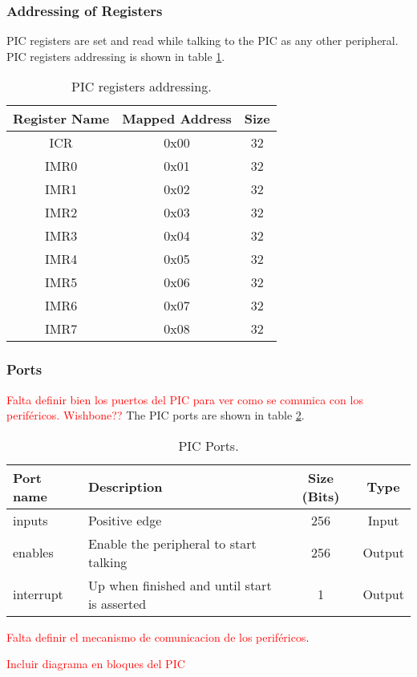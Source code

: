 \subsubsection{Addressing of Registers}
\label{sssec:pic_reg_addresses}
PIC registers are set and read while talking to the PIC as any other peripheral. PIC registers addressing is shown in table
\ref{tbl:pic_reg_addresses}.

\begin{table}
  \begin{center}
    \begin{tabular}{|c|c|c|}
    \hline
    \textbf{Register Name} & \textbf{Mapped Address} & \textbf{Size}\\
    \hline
    ICR  & 0x00 & 32\\
    IMR0 & 0x01 & 32\\
    IMR1 & 0x02 & 32\\
    IMR2 & 0x03 & 32\\
    IMR3 & 0x04 & 32\\
    IMR4 & 0x05 & 32\\
    IMR5 & 0x06 & 32\\
    IMR6 & 0x07 & 32\\
    IMR7 & 0x08 & 32\\
    \hline
    \end{tabular}
  \caption{PIC registers addressing.}
  \label{tbl:pic_reg_addresses}
  \end{center}
\end{table}

\subsubsection{Ports}
\label{ssec:pic_ports}
\textcolor{red}{Falta definir bien los puertos del PIC para ver como se comunica con los periféricos. Wishbone??}
The PIC ports are shown in table \ref{tbl:pic_ports}.

\begin{table}
  \begin{center}
    \begin{tabular}{|l|l|c|c|}
    \hline
    \textbf{Port name} & \textbf{Description} & \textbf{Size (Bits)} & \textbf{Type}\\
    \hline
    inputs             & Positive edge & 256 & Input \\
    enables            & Enable the peripheral to start talking & 256 & Output \\
    interrupt          & Up when finished and until start is asserted & 1 & Output \\
    \hline
    \end{tabular}
  \end{center}
  \caption{PIC Ports.}
  \label{tbl:pic_ports}
\end{table}

\textcolor{red}{Falta definir el mecanismo de comunicacion de los periféricos}.

\textcolor{red}{Incluir diagrama en bloques del PIC}

